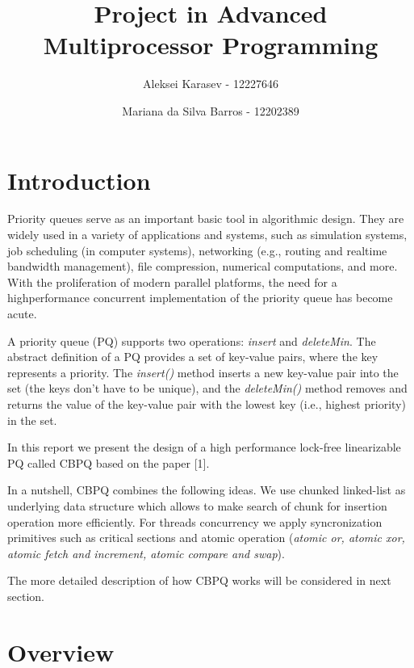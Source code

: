 \documentclass{article}
\begin{document}
\title{Project in Advanced Multiprocessor Programming}
\author[1]{Aleksei Karasev - 12227646\\}
\author[2]{Mariana da Silva Barros - 12202389}
\maketitle

\section{Introduction}
Priority queues serve as an important basic tool in algorithmic design.
They are widely used in a variety of applications and systems, such as simulation systems, job scheduling (in computer systems), networking (e.g., routing and realtime bandwidth management), file compression, numerical computations, and
more. With the proliferation of modern parallel platforms, the need for a highperformance concurrent implementation of the priority queue has become acute.\par
A priority queue (PQ) supports two operations: \textit{insert} and \textit{deleteMin}. The
abstract definition of a PQ provides a set of key-value pairs, where the key
represents a priority. The \textit{insert()} method inserts a new key-value pair into the
set (the keys don’t have to be unique), and the \textit{deleteMin()} method removes and
returns the value of the key-value pair with the lowest key (i.e., highest priority)
in the set.\par
In this report we present the design of a high performance lock-free linearizable PQ called CBPQ based on the paper [1].\par
In a nutshell, CBPQ combines the following ideas. We use chunked linked-list as underlying data structure which allows to make search of chunk for insertion operation more efficiently. For threads concurrency we apply syncronization primitives such as critical sections and atomic operation (\textit{atomic or, atomic xor, atomic fetch and increment, atomic compare and swap}).\par
The more detailed description of how CBPQ works will be considered in next section.

\section{Overview}
\end{document}
